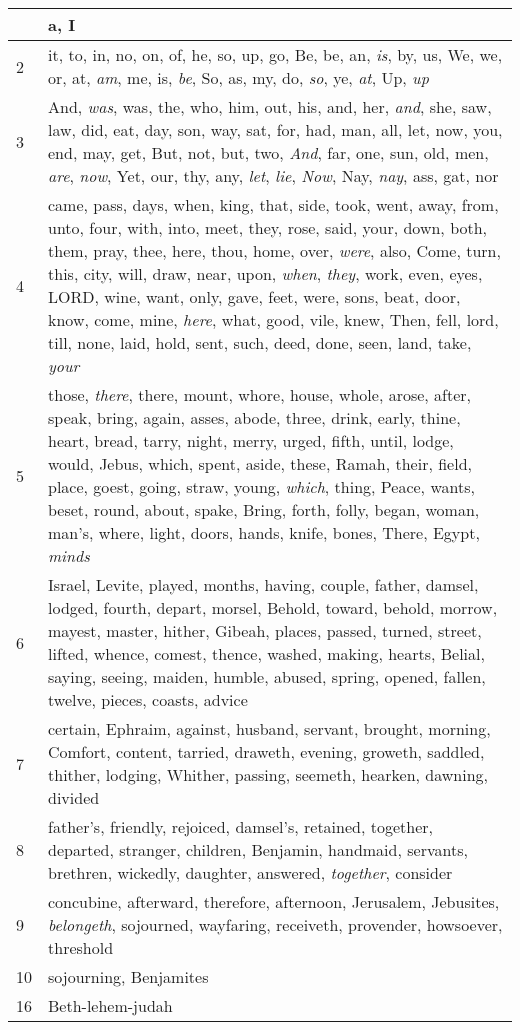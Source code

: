 \begin{longtable}{l|p{3.75in}}
\hline \hline
\endlastfoot
1 & a, I \\ \hline
2 & it, to, in, no, on, of, he, so, up, go, Be, be, an, \emph{is}, by, us, We, we, or, at, \emph{am}, me, is, \emph{be}, So, as, my, do, \emph{so}, ye, \emph{at}, Up, \emph{up} \\ \hline
3 & And, \emph{was}, was, the, who, him, out, his, and, her, \emph{and}, she, saw, law, did, eat, day, son, way, sat, for, had, man, all, let, now, you, end, may, get, But, not, but, two, \emph{And}, far, one, sun, old, men, \emph{are}, \emph{now}, Yet, our, thy, any, \emph{let}, \emph{lie}, \emph{Now}, Nay, \emph{nay}, ass, gat, nor \\ \hline
4 & came, pass, days, when, king, that, side, took, went, away, from, unto, four, with, into, meet, they, rose, said, your, down, both, them, pray, thee, here, thou, home, over, \emph{were}, also, Come, turn, this, city, will, draw, near, upon, \emph{when}, \emph{they}, work, even, eyes, LORD, wine, want, only, gave, feet, were, sons, beat, door, know, come, mine, \emph{here}, what, good, vile, knew, Then, fell, lord, till, none, laid, hold, sent, such, deed, done, seen, land, take, \emph{your} \\ \hline
5 & those, \emph{there}, there, mount, whore, house, whole, arose, after, speak, bring, again, asses, abode, three, drink, early, thine, heart, bread, tarry, night, merry, urged, fifth, until, lodge, would, Jebus, which, spent, aside, these, Ramah, their, field, place, goest, going, straw, young, \emph{which}, thing, Peace, wants, beset, round, about, spake, Bring, forth, folly, began, woman, man's, where, light, doors, hands, knife, bones, There, Egypt, \emph{minds} \\ \hline
6 & Israel, Levite, played, months, having, couple, father, damsel, lodged, fourth, depart, morsel, Behold, toward, behold, morrow, mayest, master, hither, Gibeah, places, passed, turned, street, lifted, whence, comest, thence, washed, making, hearts, Belial, saying, seeing, maiden, humble, abused, spring, opened, fallen, twelve, pieces, coasts, advice \\ \hline
7 & certain, Ephraim, against, husband, servant, brought, morning, Comfort, content, tarried, draweth, evening, groweth, saddled, thither, lodging, Whither, passing, seemeth, hearken, dawning, divided \\ \hline
8 & father's, friendly, rejoiced, damsel's, retained, together, departed, stranger, children, Benjamin, handmaid, servants, brethren, wickedly, daughter, answered, \emph{together}, consider \\ \hline
9 & concubine, afterward, therefore, afternoon, Jerusalem, Jebusites, \emph{belongeth}, sojourned, wayfaring, receiveth, provender, howsoever, threshold \\ \hline
10 & sojourning, Benjamites \\ \hline
16 & Beth-lehem-judah \\ \hline
\end{longtable}






